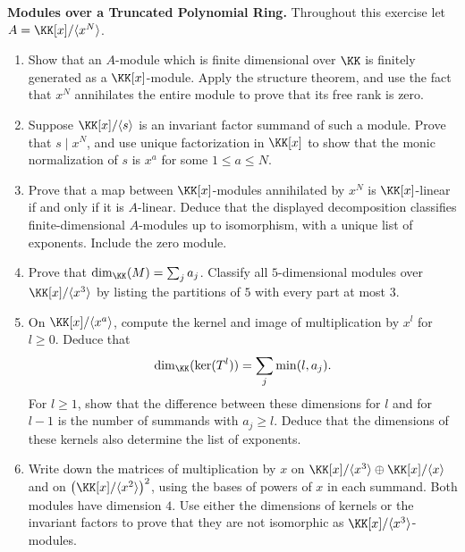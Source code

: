 \documentclass[12pt,reqno]{amsart}
\begin{document}
\begin{problems}
\item\label{s:truncated} \textbf{Modules over a Truncated Polynomial Ring.} Throughout this exercise let $A=\KK[x]/\langle x^N\rangle$.
\begin{enumerate}
\item Show that an $A$-module which is finite dimensional over $\KK$ is finitely generated as a $\KK[x]$-module. Apply the structure theorem, and use the fact that $x^N$ annihilates the entire module to prove that its free rank is zero.
\item Suppose $\KK[x]/\langle s\rangle$ is an invariant factor summand of such a module. Prove that $s\mid x^N$, and use unique factorization in $\KK[x]$ to show that the monic normalization of $s$ is $x^a$ for some $1\leq a\leq N$.
\item Prove that a map between $\KK[x]$-modules annihilated by $x^N$ is $\KK[x]$-linear if and only if it is $A$-linear. Deduce that the displayed decomposition classifies finite-dimensional $A$-modules up to isomorphism, with a unique list of exponents. Include the zero module.
\item Prove that $\dim_{\KK}(M)=\sum_ja_j$. Classify all $5$-dimensional modules over $\KK[x]/\langle x^3\rangle$ by listing the partitions of $5$ with every part at most $3$.
\item On $\KK[x]/\langle x^a\rangle$, compute the kernel and image of multiplication by $x^l$ for $l\geq0$. Deduce that
\[
\dim_{\KK}(\ker(T^l))=\sum_j\min(l,a_j).
\]
For $l\geq1$, show that the difference between these dimensions for $l$ and for $l-1$ is the number of summands with $a_j\geq l$. Deduce that the dimensions of these kernels also determine the list of exponents.
\item Write down the matrices of multiplication by $x$ on $\KK[x]/\langle x^3\rangle\oplus\KK[x]/\langle x\rangle$ and on $\bigl(\KK[x]/\langle x^2\rangle\bigr)^2$, using the bases of powers of $x$ in each summand. Both modules have dimension $4$. Use either the dimensions of kernels or the invariant factors to prove that they are not isomorphic as $\KK[x]/\langle x^3\rangle$-modules.
\end{enumerate}
\end{problems}

\hrulefill
\end{document}
